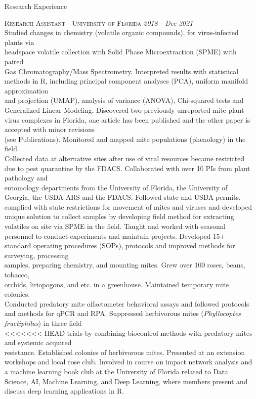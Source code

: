 \documentclass{resume} %
\begin{document}
\newpage

\begin{rSection}{Research Experience}

\textsc{Research Assistant - University of Florida} \hfill {\em \textit{2018 - Dec 2021}}\\
Studied changes in chemistry (volatile organic compounds), for virus-infected plants via\\ headspace volatile collection with Solid Phase Microextraction (SPME) with paired\\
Gas Chromatography/Mass Spectrometry. Interpreted results with statistical methods in R, including principal component analyses (PCA), uniform manifold approximation\\
and projection (UMAP), analysis of variance (ANOVA), Chi-squared tests and Generalized Linear Modeling. Discovered two previously unreported mite-plant-virus complexes in Florida, one article has been published and the other paper is accepted with minor revisions\\ (see Publications). Monitored and mapped mite populations (phenology) in the field.\\
Collected data at alternative sites after use of viral resources became restricted due to pest quarantine by the FDACS. Collaborated with over 10 PIs from plant pathology and\\
entomology departments from the University of Florida, the University of Georgia, the USDA-ARS and the FDACS. Followed state and USDA permits, complied with state restrictions for movement of mites and viruses and developed unique solution to collect samples by developing field method for extracting volatiles on site via SPME in the field. Taught and worked with seasonal personnel to conduct experiments and maintain projects. Developed 15+ standard operating procedures (SOPs), protocols and improved methods for surveying, processing\\
samples, preparing chemistry, and mounting mites. Grew over 100 roses, beans, tobacco,\\ orchids, liriopogons, and etc. in a greenhouse. Maintained temporary mite colonies.\\
Conducted predatory mite olfactometer behavioral assays and followed
protocols and methods for qPCR and RPA.  Suppressed herbivorous mites (\textit{Phyllocoptes fructiphilus}) in three field\\
<<<<<<< HEAD
trials by combining biocontrol methods with predatory mites and systemic acquired\\ resistance. Established colonies of herbivorous mites. Presented at an extension workshops and local rose club. Involved in course on impact network analysis and a machine learning book club at the University of Florida related to Data Science, AI, Machine Learning, and Deep Learning, where members present and discuss deep learning applications in R. \\

\end{rSection}
\end{document}
